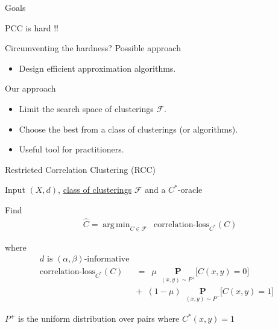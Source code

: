 \documentclass{beamer}
\newcommand{\mc}{\mathcal}
\newcommand{\mb}{\mathbf}
\DeclareMathOperator*{\argmin}{arg\,min}
\begin{document}
\begin{frame}{Goals}
	\Huge{
    \begin{center}
    	PCC is hard !!\\
    	\Frowny{} 
   	\end{center}
    }
\end{frame}

\begin{frame}{Circumventing the hardness?}
	Possible approach
	\begin{itemize}
		\item Design efficient approximation algorithms.		
	\end{itemize}
	
	\vspace{30pt}Our approach
	\begin{itemize}
		\vspace{5pt}\item Limit the search space of clusterings $\mc F$.
		\vspace{5pt}\item Choose the best from a class of clusterings (or algorithms).
		\vspace{5pt}\item Useful tool for practitioners. 
	\end{itemize}
\end{frame}


\begin{frame}[label=RCC]{Restricted Correlation Clustering (RCC)}
	\begin{block}{Input}
		$(X, d)$, \hyperlink{RCCVariations}{class of clusterings} $\mc F$ and a $C^*$-oracle
	\end{block}
	
	\vspace{10pt}\begin{block}{Find}
		\vspace{-15pt}\begin{align*}
		  &\hat C = \argmin_{C \in \mc F} \enspace \text{correlation-loss}_{C^*}(C)
		\end{align*}	
	\end{block}
	
	\begin{block}{where}
		\vspace{-20pt}\begin{align*}
			d \text{ is }(\alpha, \beta)\text{-informative}&\\
			\text{correlation-loss}_{C^*}(C) &= \enspace  \mu \enspace \underset{(x, y) \sim P^+}{\mb P} \big[ C(x, y) = 0 ] \\
			&+\enspace (1-\mu) \enspace \underset{(x, y) \sim P^-}{\mb P} \big[ C(x, y) = 1] 
		\end{align*}
	\end{block}	
	$P^+$ is the uniform distribution over pairs where $C^*(x, y) = 1$
\end{frame}
\end{document}
